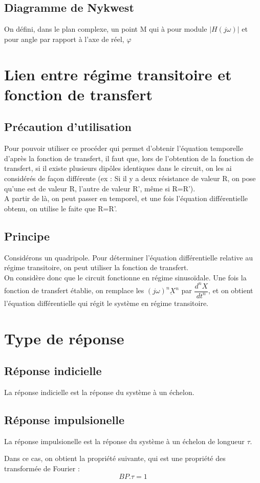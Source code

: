 \subsection{Diagramme de Nykwest}
On défini, dans le plan complexe, un point M qui à pour module $|H(j\omega)|$ et pour angle par rapport à l'axe de réel, $\varphi$
\section{Lien entre régime transitoire et fonction de transfert}
\subsection{Précaution d'utilisation}
Pour pouvoir utiliser ce procéder qui permet d'obtenir l'équation temporelle d'après la fonction de transfert, il faut que, lors de l'obtention de la fonction de transfert, si il existe plusieurs dipôles identiques dans le circuit, on les ai considérés de façon différente (ex : Si il y a deux résistance de valeur R, on pose qu'une est de valeur R, l'autre de valeur R', même si R=R').\\
A partir de là, on peut passer en temporel, et une fois l'équation différentielle obtenu, on utilise le faite que R=R'.
\subsection{Principe}
Considérons un quadripole. Pour déterminer l'équation différentielle relative au régime transitoire, on peut utiliser la fonction de transfert.\\
On considère donc que le circuit fonctionne en régime sinusoïdale. Une fois la fonction de transfert établie, on remplace les $(j\omega)^n\underbar{X}^n$ par $\dfrac{d^nX}{dt^n}$, et on obtient l'équation différentielle qui régit le système en régime transitoire.
\section{Type de réponse}
\subsection{Réponse indicielle}
La réponse indicielle est la réponse du système à un échelon.
\subsection{Réponse impulsionelle}
La réponse impulsionelle est la réponse du système à un échelon de longueur $\tau$.
\begin{prop}
Dans ce cas, on obtient la propriété suivante, qui est une propriété des transformée de Fourier : 
$$BP.\tau = 1$$
\end{prop}
